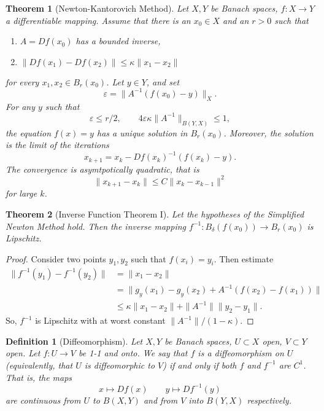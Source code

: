 \documentclass[letterpaper,twoside,12pt]{article}
\theoremstyle{mystyle}
\newtheorem{theorem}{Theorem}[section]
\newtheorem{definition}{Definition}[section]
\newcommand{\ve}{\varepsilon}
\newcommand{\inv}{^{-1}}
\begin{document}
  \begin{tcolorbox}[colback=red!5!white,colframe=red!75!black]
    \begin{theorem}[Newton-Kantorovich Method]
      Let \(X, Y\) be Banach spaces, \(f:X\to Y\) a differentiable mapping. Assume that there is an \(x_0 \in X\) and an \(r>0\) such that 
      \begin{enumerate}
        \item \(A=Df(x_0)\) has a bounded inverse,
        \item \(\|Df(x_1) - Df(x_2)\| \leq \kappa \|x_1-x_2\|\)
      \end{enumerate}
      for every \(x_1, x_2 \in B_r(x_0)\). Let \(y\in Y\), and set 
      \[\ve = \|A\inv (f(x_0)-y)\|_X.\]
      For any \(y\) such that 
      \[\ve \leq r/2, \qquad 4\ve \kappa \|A\inv\|_{B(Y,X)}\leq 1,\]
      the equation \(f(x) = y\) has a unique solution in \(B_r(x_0)\). Moreover, the solution is the limit of the iterations 
      \[x_{k+1} = x_k - Df(x_k)\inv (f(x_k)-y).\]
      The convergence is asymtpotically quadratic, that is 
      \[\|x_{k+1}-x_k\|\leq C\|x_k-x_{k-1}\|^2\]
      for large $k$. 
    \end{theorem}
  \end{tcolorbox}

  \begin{tcolorbox}[colback=red!5!white,colframe=red!75!black]
    \begin{theorem}[Inverse Function Theorem I]
      Let the hypotheses of the Simplified Newton Method hold. Then the inverse mapping $f\inv : B_{\delta}(f(x_0)) \to B_r(x_0)$ is Lipschitz. 
    \end{theorem}
  \end{tcolorbox}
  \begin{proof}
    Consider two points $y_1, y_2$ such that $f(x_i) = y_i$. Then estimate
    \begin{align*}
      \|f\inv (y_1) - f\inv (y_2)\| &= \|x_1-x_2\| \\
      &= \|g_y(x_1)- g_y(x_2) + A\inv(f(x_2)-f(x_1))\| \\
      &\leq \kappa \|x_1 - x_2\| + \|A\inv\| \|y_2-y_1\|.
    \end{align*}
    So, \(f\inv\) is Lipschitz with at worst constant \(\|A\inv\|/(1-\kappa)\).
  \end{proof}

  \begin{definition}[Diffeomorphism]
    Let \(X,Y\) be Banach spaces, \(U\subset X\) open, \(V\subset Y\) open. Let $f:U\to V$ be 1-1 and onto. We say that \(f\) is a diffeomorphism on $U$ (equivalently, that $U$ is diffeomorphic to $V$) if and only if both \(f\) and \(f\inv\) are $C^1$. That is, the maps 
    \[x \mapsto Df(x)\qquad y \mapsto Df\inv(y)\]
    are continuous from $U$ to $B(X, Y)$ and from $V$ into $B(Y, X)$ respectively.
  \end{definition}
  
\end{document}
